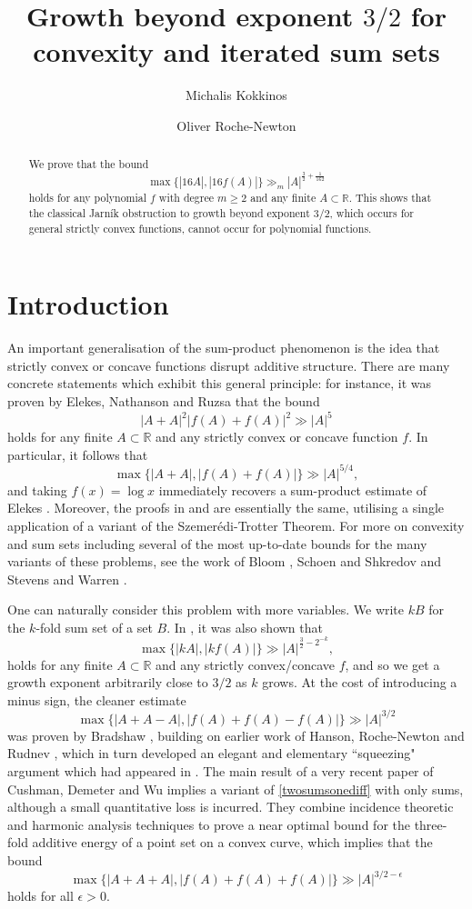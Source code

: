 \documentclass[11pt]{amsart}
\title[Growth beyond exponent $3/2$ for convexity and iterated sum sets]{Growth beyond exponent $3/2$ for convexity and iterated sum sets}
\author{Michalis Kokkinos}
\author{Oliver Roche-Newton}
\date{}
\begin{document}
\begin{abstract} We prove that the bound
\[
\max \{ |16A|,|16f(A)| \} \gg_m |A|^{\frac{3}{2}+\frac{1}{162}}
\]
holds for any polynomial $f$ with degree $m \geq 2$ and any finite $A \subset \mathbb R$. This shows that the classical Jarn\'{i}k obstruction to growth beyond exponent $3/2$, which occurs for general strictly convex functions, cannot occur for polynomial functions.

\end{abstract}
\maketitle
\section{Introduction}

An important generalisation of the sum-product phenomenon is the idea that strictly convex or concave functions disrupt additive structure. There are many concrete statements which exhibit this general principle: for instance, it was proven by Elekes, Nathanson and Ruzsa \cite{ENR} that the bound
\[
|A+A|^2|f(A)+f(A)|^2 \gg |A|^5
\]
holds for any finite $A \subset \mathbb R$ and any strictly convex or concave function $f$. In particular, it follows that
\[
\max \{|A+A|,|f(A)+f(A)| \} \gg |A|^{5/4},
\]
and taking $f(x)= \log x$ immediately recovers a sum-product estimate of Elekes \cite{El}. Moreover, the proofs in \cite{El} and \cite{ENR} are essentially the same, utilising a single application of a variant of the Szemer\'{e}di-Trotter Theorem. For more on convexity and sum sets including several of the most up-to-date bounds for the many variants of these problems, see the work of Bloom \cite{Bl25}, Schoen and Shkredov \cite{ScSh} and Stevens and Warren \cite{StWa22}.

One can naturally consider this problem with more variables. We write $kB$ for the $k$-fold sum set of a set $B$. In \cite{ENR}, it was also shown that
\[
\max \{|kA|, |kf(A)| \} \gg |A|^{\frac{3}{2}-2^{-k}},
\]
holds for any finite $A \subset \mathbb R$ and any strictly convex/concave $f$,
and so we get a growth exponent arbitrarily close to $3/2$ as $k$ grows. At the cost of introducing a minus sign, the cleaner estimate
\begin{equation} \label{twosumsonediff}
\max \{|A+A-A|, |f(A)+f(A)-f(A)| \} \gg |A|^{3/2}
\end{equation}
was proven by Bradshaw \cite{Br}, building on earlier work of Hanson, Roche-Newton and Rudnev \cite{HRR}, which in turn developed an elegant and elementary ``squeezing" argument which had appeared in \cite{RSSS}. The main result of a very recent paper of Cushman, Demeter and Wu \cite{CDW} implies a variant of \eqref{twosumsonediff} with only sums, although a small quantitative loss is incurred. They combine incidence theoretic and harmonic analysis techniques to prove a near optimal bound for the three-fold additive energy of a point set on a convex curve, which implies that the bound
\begin{equation} \label{threesums}
\max \{|A+A+A|, |f(A)+f(A)+f(A)| \} \gg |A|^{3/2-\epsilon}
\end{equation}
holds for all $\epsilon >0$.
\end{document}
